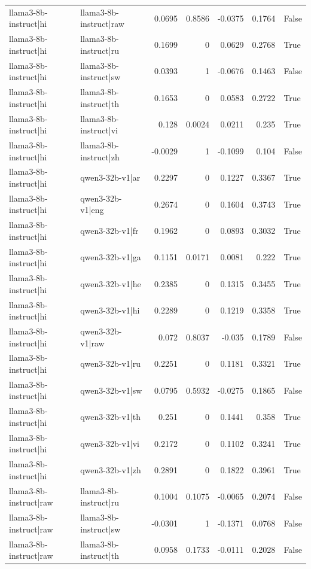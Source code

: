 \begin{table}
\begin{tabular}{l l r r r r l}
llama3-8b-instruct|hi & llama3-8b-instruct|raw & 0.0695 & 0.8586 & -0.0375 & 0.1764 & False \\
llama3-8b-instruct|hi & llama3-8b-instruct|ru & 0.1699 & 0 & 0.0629 & 0.2768 & True \\
llama3-8b-instruct|hi & llama3-8b-instruct|sw & 0.0393 & 1 & -0.0676 & 0.1463 & False \\
llama3-8b-instruct|hi & llama3-8b-instruct|th & 0.1653 & 0 & 0.0583 & 0.2722 & True \\
llama3-8b-instruct|hi & llama3-8b-instruct|vi & 0.128 & 0.0024 & 0.0211 & 0.235 & True \\
llama3-8b-instruct|hi & llama3-8b-instruct|zh & -0.0029 & 1 & -0.1099 & 0.104 & False \\
llama3-8b-instruct|hi & qwen3-32b-v1|ar & 0.2297 & 0 & 0.1227 & 0.3367 & True \\
llama3-8b-instruct|hi & qwen3-32b-v1|eng & 0.2674 & 0 & 0.1604 & 0.3743 & True \\
llama3-8b-instruct|hi & qwen3-32b-v1|fr & 0.1962 & 0 & 0.0893 & 0.3032 & True \\
llama3-8b-instruct|hi & qwen3-32b-v1|ga & 0.1151 & 0.0171 & 0.0081 & 0.222 & True \\
llama3-8b-instruct|hi & qwen3-32b-v1|he & 0.2385 & 0 & 0.1315 & 0.3455 & True \\
llama3-8b-instruct|hi & qwen3-32b-v1|hi & 0.2289 & 0 & 0.1219 & 0.3358 & True \\
llama3-8b-instruct|hi & qwen3-32b-v1|raw & 0.072 & 0.8037 & -0.035 & 0.1789 & False \\
llama3-8b-instruct|hi & qwen3-32b-v1|ru & 0.2251 & 0 & 0.1181 & 0.3321 & True \\
llama3-8b-instruct|hi & qwen3-32b-v1|sw & 0.0795 & 0.5932 & -0.0275 & 0.1865 & False \\
llama3-8b-instruct|hi & qwen3-32b-v1|th & 0.251 & 0 & 0.1441 & 0.358 & True \\
llama3-8b-instruct|hi & qwen3-32b-v1|vi & 0.2172 & 0 & 0.1102 & 0.3241 & True \\
llama3-8b-instruct|hi & qwen3-32b-v1|zh & 0.2891 & 0 & 0.1822 & 0.3961 & True \\
llama3-8b-instruct|raw & llama3-8b-instruct|ru & 0.1004 & 0.1075 & -0.0065 & 0.2074 & False \\
llama3-8b-instruct|raw & llama3-8b-instruct|sw & -0.0301 & 1 & -0.1371 & 0.0768 & False \\
llama3-8b-instruct|raw & llama3-8b-instruct|th & 0.0958 & 0.1733 & -0.0111 & 0.2028 & False \\

\end{tabular}
\end{table}
